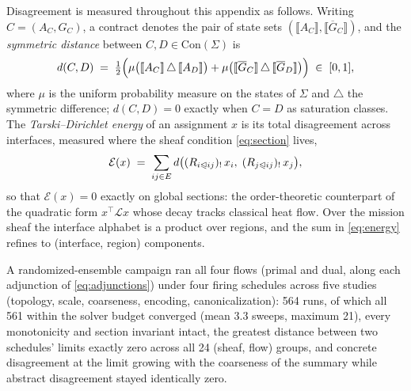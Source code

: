 \documentclass[10pt]{article}
\newcommand{\face}{\trianglelefteqslant}
\newcommand{\Lap}{\mathcal{L}}
\newcommand{\Con}[1]{\text{Con}(#1)}
\newcommand{\sat}[1]{\overline{#1}}
\theoremstyle{definition}
\theoremstyle{remark}
\begin{document}
Disagreement is measured throughout this appendix as follows. Writing $C = (A_C, G_C)$, a contract denotes the pair of state sets $(\llbracket A_C \rrbracket, \llbracket \sat{G}_C \rrbracket)$, and the \emph{symmetric distance} between $C, D \in \Con{\Sigma}$ is
\begin{equation*}
d(C, D) \;=\; \tfrac{1}{2}\Bigl(\mu\bigl(\llbracket A_C \rrbracket \,\triangle\, \llbracket A_D \rrbracket\bigr) + \mu\bigl(\llbracket \sat{G}_C \rrbracket \,\triangle\, \llbracket \sat{G}_D \rrbracket\bigr)\Bigr) \;\in\; [0, 1],
\end{equation*}
where $\mu$ is the uniform probability measure on the states of $\Sigma$ and $\triangle$ the symmetric difference; $d(C, D) = 0$ exactly when $C = D$ as saturation classes. The \emph{Tarski--Dirichlet energy} of an assignment $x$ is its total disagreement across interfaces, measured where the sheaf condition \eqref{eq:section} lives,
\begin{equation}
\label{eq:energy}
\mathcal{E}(x) \;=\; \sum_{ij \in E} d\bigl((R_{i \face ij})_{!}\, x_i,\; (R_{j \face ij})_{!}\, x_j\bigr),
\end{equation}
so that $\mathcal{E}(x) = 0$ exactly on global sections: the order-theoretic counterpart of the quadratic form $x^{\top}\!\Lap x$ whose decay tracks classical heat flow. Over the mission sheaf the interface alphabet is a product over regions, and the sum in \eqref{eq:energy} refines to (interface, region) components.

A randomized-ensemble campaign ran all four flows (primal and dual, along each adjunction of \eqref{eq:adjunctions}) under four firing schedules across five studies (topology, scale, coarseness, encoding, canonicalization): 564 runs, of which all 561 within the solver budget converged (mean 3.3 sweeps, maximum 21), every monotonicity and section invariant intact, the greatest distance between two schedules' limits exactly zero across all 24 (sheaf, flow) groups, and concrete disagreement at the limit growing with the coarseness of the summary while abstract disagreement stayed identically zero.
\end{document}
